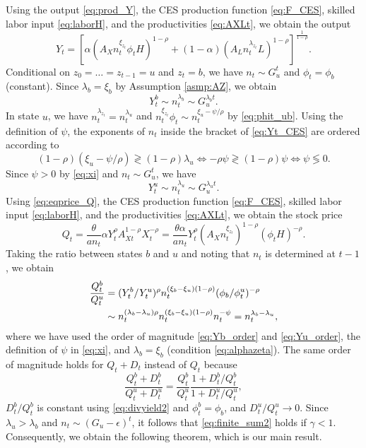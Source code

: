\documentclass[a4paper,12pt]{article}
\numberwithin{equation}{section}
\theoremstyle{plain}
\begin{document}
Using the output \eqref{eq:prod_Y}, the CES production function \eqref{eq:F_CES}, skilled labor input \eqref{eq:laborH}, and the productivities \eqref{eq:AXLt}, we obtain the output
\begin{equation}
    Y_t=\left[\alpha(A_Xn_t^{\xi_{z_t}}\phi_tH)^{1-\rho}+(1-\alpha) (A_Ln_t^{\lambda_{z_t}}L)^{1-\rho}\right]^\frac{1}{1-\rho}. \label{eq:Yt_CES}
\end{equation}
Conditional on $z_0=\dots=z_{t-1}=u$ and $z_t=b$, we have $n_t\sim G_u^t$ and $\phi_t=\phi_b$ (constant). Since $\lambda_b=\xi_b$ by Assumption \ref{asmp:AZ}, we obtain
\begin{equation}
    Y_t^b\sim n_t^{\lambda_b}\sim G_u^{\lambda_bt}. \label{eq:Yb_order}
\end{equation}
In state $u$, we have $n_t^{\lambda_{z_t}}=n_t^{\lambda_u}$ and $n_t^{\xi_{z_t}}\phi_t\sim n_t^{\xi_u-\psi/\rho}$ by \eqref{eq:phit_ub}. Using the definition of $\psi$, the exponents of $n_t$ inside the bracket of \eqref{eq:Yt_CES} are ordered according to
\begin{equation*}
    (1-\rho)(\xi_u-\psi/\rho)\gtrless (1-\rho)\lambda_u \iff -\rho\psi\gtrless (1-\rho)\psi \iff \psi \lessgtr 0.
\end{equation*}
Since $\psi>0$ by \eqref{eq:xi} and $n_t\sim G_u^t$, we have
\begin{equation}
    Y_t^u\sim n_t^{\lambda_u}\sim G_u^{\lambda_ut}. \label{eq:Yu_order}
\end{equation}
Using \eqref{eq:eqprice_Q}, the CES production function \eqref{eq:F_CES}, skilled labor input \eqref{eq:laborH}, and the productivities \eqref{eq:AXLt}, we obtain the stock price
\begin{equation*}
    Q_t=\frac{\theta}{an_t}\alpha Y_t^\rho A_{Xt}^{1-\rho}X_t^{-\rho}=\frac{\theta\alpha}{an_t}Y_t^\rho (A_Xn_t^{\xi_{z_t}})^{1-\rho}(\phi_t H)^{-\rho}.
\end{equation*}
Taking the ratio between states $b$ and $u$ and noting that $n_t$ is determined at $t-1$, we obtain
\begin{align}
    \frac{Q_t^b}{Q_t^u}&=(Y_t^b/Y_t^u)^\rho n_t^{(\xi_b-\xi_u)(1-\rho)}(\phi_b/\phi_t^u)^{-\rho} \notag \\
    &\sim n_t^{(\lambda_b-\lambda_u)\rho}n_t^{(\xi_b-\xi_u)(1-\rho)}n_t^{-\psi}=n_t^{\lambda_b-\lambda_u}, \label{eq:Q_ratio}
\end{align}
where we have used the order of magnitude \eqref{eq:Yb_order} and \eqref{eq:Yu_order}, the definition of $\psi$ in \eqref{eq:xi}, and $\lambda_b=\xi_b$ (condition \eqref{eq:alphazeta}). The same order of magnitude holds for $Q_t+D_t$ instead of $Q_t$ because
\begin{equation*}
    \frac{Q_t^b+D_t^b}{Q_t^u+D_t^u}=\frac{Q_t^b}{Q_t^u}\frac{1+D_t^b/Q_t^b}{1+D_t^u/Q_t^u},
\end{equation*}
$D_t^b/Q_t^b$ is constant using \eqref{eq:divyield2} and $\phi_t^b=\phi_b$, and $D_t^u/Q_t^u\to 0$. Since $\lambda_u>\lambda_b$ and $n_t\sim (G_u-\epsilon)^t$, it follows that \eqref{eq:finite_sum2} holds if $\gamma<1$. Consequently, we obtain the following theorem, which is our main result.
\end{document}
